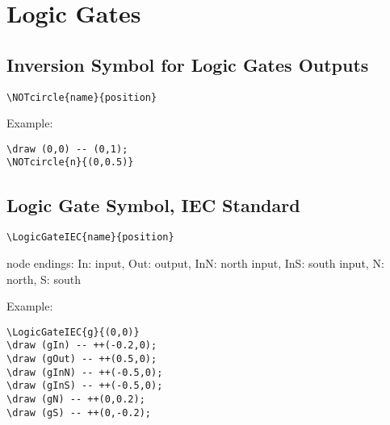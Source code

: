 \documentclass[parskip=full]{scrartcl}
\begin{document}
\section{Logic Gates}

\subsection{Inversion Symbol for Logic Gates Outputs}

\begin{verbatim}
\NOTcircle{name}{position}
\end{verbatim}

Example:\\
\begin{minipage}{0.8\textwidth}
\begin{verbatim}
\draw (0,0) -- (0,1);
\NOTcircle{n}{(0,0.5)}
\end{verbatim}
\end{minipage}
\begin{minipage}{0.19\textwidth}
\end{minipage}

\subsection{Logic Gate Symbol, IEC Standard}

\begin{verbatim}
\LogicGateIEC{name}{position}
\end{verbatim}
node endings: In: input, Out: output,
              InN: north input, InS: south input,
              N: north, S: south

Example:\\
\begin{minipage}{0.8\textwidth}
\begin{verbatim}
\LogicGateIEC{g}{(0,0)}
\draw (gIn) -- ++(-0.2,0);
\draw (gOut) -- ++(0.5,0);
\draw (gInN) -- ++(-0.5,0);
\draw (gInS) -- ++(-0.5,0);
\draw (gN) -- ++(0,0.2);
\draw (gS) -- ++(0,-0.2);
\end{verbatim}
\end{minipage}
\begin{minipage}{0.19\textwidth}
\end{minipage}
\end{document}
